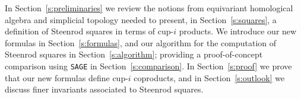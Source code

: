 In Section~\ref{s:preliminaries} we review the notions from equivariant homological algebra and simplicial topology needed to present, in Section~\ref{s:squares}, a definition of Steenrod squares in terms of cup-$i$ products.
We introduce our new formulas in Section~\ref{s:formulas}, and our algorithm for the computation of Steenrod squares in Section~\ref{s:algorithm}; providing a proof-of-concept comparison using \verb|SAGE| in Section~\ref{s:comparison}.
In Section~\ref{s:proof} we prove that our new formulas define cup-$i$ coproducts, and in Section~\ref{s:outlook} we discuss finer invariants associated to Steenrod squares.